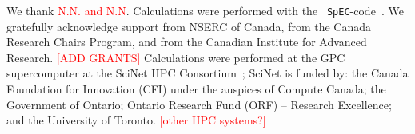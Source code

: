 \documentclass[aps,prd,amsmath,floatfix
,twocolumn
,superscriptaddress,nofootinbib,showpacs]{revtex4-1}
\theoremstyle{plain} \newtheorem{thm}{Theorem} \newtheorem{lem}{Lemma}
\newcommand{\red}[1]{\textcolor{Red}{#1}}
\begin{document}
\begin{acknowledgments}
We thank \red{N.N. and N.N}.
Calculations were performed with the {\tt
  SpEC}-code~\cite{SpECwebsite}.  We gratefully acknowledge support
from NSERC of Canada, from the Canada Research Chairs Program, and
from the Canadian Institute for Advanced Research.  
\red{[ADD GRANTS]}
Calculations were performed at the GPC supercomputer at the SciNet HPC
Consortium~\cite{scinet}; SciNet is funded by: the Canada Foundation
for Innovation (CFI) under the auspices of Compute Canada; the
Government of Ontario; Ontario Research Fund (ORF) -- Research
Excellence; and the University of Toronto.  
\red{[other HPC systems?]}
\end{acknowledgments}



\end{document}
